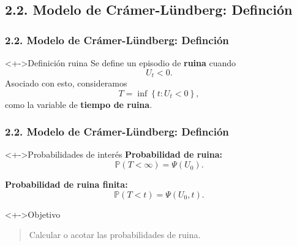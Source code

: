 \documentclass[cjk,t,compress]{beamer}
\renewcommand{\inf}{\operatorname{\text{inf}}}
\begin{document}
%
%
\subsection{2.2. Modelo de Cr\'amer-L\"undberg: Definci\'on}

\begin{frame}[fragile]
\frametitle{2.2. Modelo de Cr\'amer-L\"undberg: Definci\'on}
\scriptsize  	

\vspace{0.1cm}
\begin{block}<+->{Definici\'on ruina}
	\vspace{0.1cm}
	Se define un episodio de {\bf ruina} cuando 
	$$
	U_t < 0.
	$$
	Asociado con esto, consideramos
	$$
	T=\inf\left\{t:U_t < 0\right\},
	$$
	como la variable de {\bf tiempo de ruina}.
\end{block}


\end{frame}


\begin{frame}[fragile]
\frametitle{2.2. Modelo de Cr\'amer-L\"undberg: Definci\'on}
\scriptsize  	

\vspace{0.1cm}
\begin{block}<+->{Probabilidades de inter\'es}
	\vspace{0.1cm}
	{\bf Probabilidad de ruina:}
	\begin{equation}
		\mathbb{P}(T < \infty) = \Psi(U_0).
	\end{equation}

	{\bf Probabilidad de ruina finita:}
	\begin{equation}
		\mathbb{P}(T < t) = \Psi(U_0,t).
	\end{equation}	
\end{block}

\begin{block}<+->{Objetivo}
	\vspace{0.1cm}
	\begin{quote}
		Calcular o acotar las probabilidades de ruina.
	\end{quote}
\end{block}

\end{frame}
\end{document}

